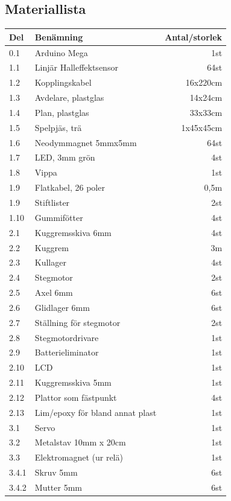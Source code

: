 \documentclass[a4paper]{article}
\begin{document}
\begin{appendix}
\section{Materiallista}
    \centering
        \begin{tabular}{ | l | l | r | }
\hline
Del & Benämning & Antal/storlek \\
\hline
\hline
0.1 & Arduino Mega & 1st \\
1.1 & Linjär Halleffektsensor & 64st \\
1.2 & Kopplingskabel & 16x220cm \\
1.3 & Avdelare, plastglas & 14x24cm \\
1.4 & Plan, plastglas & 33x33cm \\
1.5 & Spelpjäs, trä & 1x45x45cm \\
1.6 & Neodymmagnet 5mmx5mm & 64st \\
1.7 & LED, 3mm grön & 4st \\
1.8 & Vippa & 1st \\
1.9 & Flatkabel, 26 poler & 0,5m \\
1.9 & Stiftlister & 2st \\
1.10 & Gummifötter & 4st \\
2.1 & Kuggremsskiva 6mm & 4st \\
2.2 & Kuggrem & 3m \\
2.3 & Kullager & 4st \\
2.4 & Stegmotor & 2st \\
2.5 & Axel 6mm & 6st \\
2.6 & Glidlager 6mm & 6st \\
2.7 & Ställning för stegmotor & 2st \\
2.8 & Stegmotordrivare & 1st \\
2.9 & Batterieliminator & 1st \\
2.10 & LCD & 1st \\
2.11 & Kuggremsskiva 5mm & 1st \\
2.12 & Plattor som fästpunkt & 4st \\
2.13 & Lim/epoxy för bland annat plast & 1st \\
3.1 & Servo & 1st \\
3.2 & Metalstav 10mm x 20cm & 1st \\
3.3 & Elektromagnet (ur relä) & 1st \\
3.4.1 & Skruv 5mm & 6st \\
3.4.2 & Mutter 5mm & 6st \\
\hline
        \end{tabular}

\end{appendix}
\end{document}
